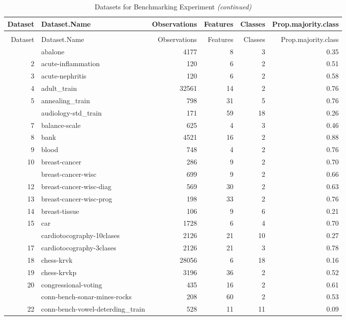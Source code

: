 \documentclass[]{elsarticle} %
\begin{document}
\begin{longtable}[t]{rlrrrr}
\caption{\label{tab:dataset-description}\label{tab:Datasets}Datasets for Benchmarking Experiment}\\
\toprule
Dataset & Dataset.Name & Observations & Features & Classes & Prop.majority.class\\
\midrule
\endfirsthead
\caption[]{\label{tab:Datasets}Datasets for Benchmarking Experiment \textit{(continued)}}\\
\toprule
Dataset & Dataset.Name & Observations & Features & Classes & Prop.majority.class\\
\midrule
\endhead
\
\endfoot
\bottomrule
\endlastfoot
1 & abalone & 4177 & 8 & 3 & 0.35\\
2 & acute-inflammation & 120 & 6 & 2 & 0.51\\
3 & acute-nephritis & 120 & 6 & 2 & 0.58\\
4 & adult\_train & 32561 & 14 & 2 & 0.76\\
5 & annealing\_train & 798 & 31 & 5 & 0.76\\
\addlinespace
6 & audiology-std\_train & 171 & 59 & 18 & 0.26\\
7 & balance-scale & 625 & 4 & 3 & 0.46\\
8 & bank & 4521 & 16 & 2 & 0.88\\
9 & blood & 748 & 4 & 2 & 0.76\\
10 & breast-cancer & 286 & 9 & 2 & 0.70\\
\addlinespace
11 & breast-cancer-wisc & 699 & 9 & 2 & 0.66\\
12 & breast-cancer-wisc-diag & 569 & 30 & 2 & 0.63\\
13 & breast-cancer-wisc-prog & 198 & 33 & 2 & 0.76\\
14 & breast-tissue & 106 & 9 & 6 & 0.21\\
15 & car & 1728 & 6 & 4 & 0.70\\
\addlinespace
16 & cardiotocography-10clases & 2126 & 21 & 10 & 0.27\\
17 & cardiotocography-3clases & 2126 & 21 & 3 & 0.78\\
18 & chess-krvk & 28056 & 6 & 18 & 0.16\\
19 & chess-krvkp & 3196 & 36 & 2 & 0.52\\
20 & congressional-voting & 435 & 16 & 2 & 0.61\\
\addlinespace
21 & conn-bench-sonar-mines-rocks & 208 & 60 & 2 & 0.53\\
22 & conn-bench-vowel-deterding\_train & 528 & 11 & 11 & 0.09\\

\end{longtable}
\end{document}
